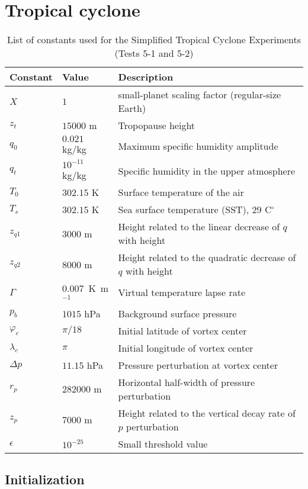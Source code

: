 \documentclass[times,doublespace]{fldauth}
\begin{document}
\section{Tropical cyclone}

\begin{table}[h]

\caption{List of constants used for the Simplified Tropical Cyclone Experiments (Tests 5-1 and 5-2)}

\begin{tabular*}{\textwidth}{@{\extracolsep{\fill}}lll}
\hline Constant & Value & Description \\
\hline
$X$ & $1$ & small-planet scaling factor (regular-size Earth)\\
$z_t$ & $15000$ m & Tropopause height \\
$q_0$ & $0.021$ kg/kg & Maximum specific humidity amplitude \\
$q_t$ & $10^{-11}$ kg/kg & Specific humidity in the upper atmosphere \\
$T_0$ & $302.15$ K & Surface temperature of the air \\
$T_s$ & $302.15$ K & Sea surface temperature (SST), 29 C$^\circ$\\
$z_{q1}$ & $3000$ m & Height related to the linear decrease of $q$ with height \\
$z_{q2}$ & $8000$ m & Height related to the quadratic decrease of $q$ with height \\
$\Gamma$ & $0.007$\ K\ m$^{-1}$ & Virtual temperature lapse rate \\
$p_{b}$ & $1015$ hPa & Background surface pressure \\
$\varphi_c$ & $\pi / 18$ & Initial latitude of vortex center \\
$\lambda_c$ & $\pi$ & Initial longitude of vortex center \\
$\Delta p$ & $11.15$ hPa & Pressure perturbation at vortex center \\
$r_p$ & $282000$ m & Horizontal half-width of pressure perturbation \\
$z_p$ & $7000$ m & Height related to the vertical decay rate of $p$ perturbation \\
$\epsilon$ & $10^{-25}$ & Small threshold value \\
\hline 
\end{tabular*}

\end{table}


\subsection{ Initialization }
\end{document}
